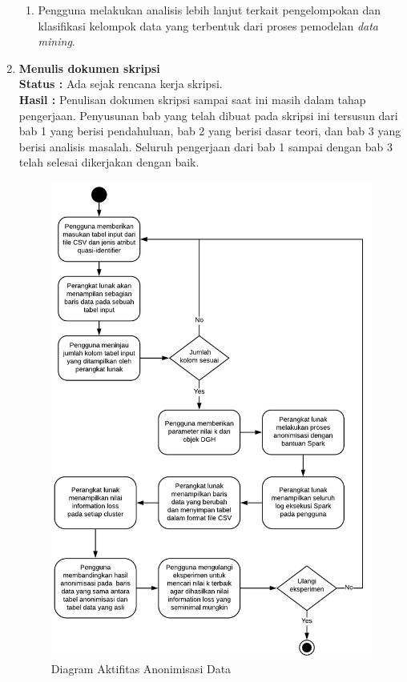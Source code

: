 \documentclass[a4paper,twoside]{article}
\begin{document}
\begin{enumerate}
\begin{enumerate}
\item Pengguna melakukan analisis lebih lanjut terkait pengelompokan dan klasifikasi kelompok data yang terbentuk dari proses pemodelan \textit{data mining}.

\end{enumerate}

\item \textbf{Menulis dokumen skripsi}\\
		{\bf Status :} Ada sejak rencana kerja skripsi.\\
		{\bf Hasil :} Penulisan dokumen skripsi sampai saat ini masih dalam tahap pengerjaan. Penyusunan bab yang telah dibuat pada skripsi ini tersusun dari bab 1 yang berisi pendahuluan, bab 2 yang berisi dasar teori, dan bab 3 yang berisi analisis masalah. Seluruh pengerjaan dari bab 1 sampai dengan bab 3 telah selesai dikerjakan dengan baik. 

\newpage
\begin{figure}[H]
	\centering
	\includegraphics[scale=0.8]{pl_anonimisasi}
	\caption{Diagram Aktifitas Anonimisasi Data}
	\label{fig:pl_anonimisasi}
\end{figure}


\end{enumerate}
\end{document}
